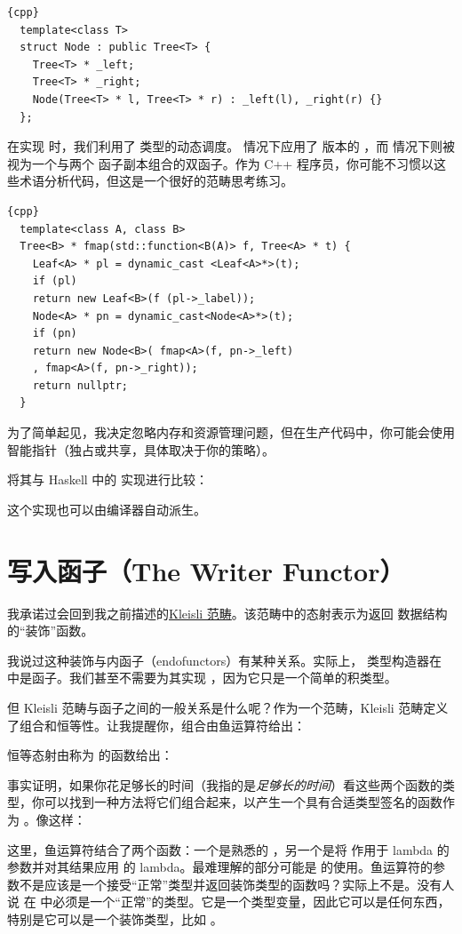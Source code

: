 \begin{lstlisting}{cpp}
  template<class T>
  struct Node : public Tree<T> {
    Tree<T> * _left;
    Tree<T> * _right;
    Node(Tree<T> * l, Tree<T> * r) : _left(l), _right(r) {}
  };
\end{lstlisting}
在实现  时，我们利用了  类型的动态调度。  情况下应用了  版本的 ，而  情况下则被视为一个与两个  函子副本组合的双函子。作为 C++ 程序员，你可能不习惯以这些术语分析代码，但这是一个很好的范畴思考练习。

\begin{lstlisting}{cpp}
  template<class A, class B>
  Tree<B> * fmap(std::function<B(A)> f, Tree<A> * t) {
    Leaf<A> * pl = dynamic_cast <Leaf<A>*>(t);
    if (pl)
    return new Leaf<B>(f (pl->_label));
    Node<A> * pn = dynamic_cast<Node<A>*>(t);
    if (pn)
    return new Node<B>( fmap<A>(f, pn->_left)
    , fmap<A>(f, pn->_right));
    return nullptr;
  }
\end{lstlisting}
为了简单起见，我决定忽略内存和资源管理问题，但在生产代码中，你可能会使用智能指针（独占或共享，具体取决于你的策略）。

将其与 Haskell 中的  实现进行比较：

这个实现也可以由编译器自动派生。

\section{写入函子（The Writer Functor）}

我承诺过会回到我之前描述的\hyperref[kleisli-categories]{Kleisli 范畴}。该范畴中的态射表示为返回  数据结构的“装饰”函数。

我说过这种装饰与内函子（endofunctors）有某种关系。实际上， 类型构造器在  中是函子。我们甚至不需要为其实现 ，因为它只是一个简单的积类型。

但 Kleisli 范畴与函子之间的一般关系是什么呢？作为一个范畴，Kleisli 范畴定义了组合和恒等性。让我提醒你，组合由鱼运算符给出：

恒等态射由称为  的函数给出：

事实证明，如果你花足够长的时间（我指的是\emph{足够长的时间}）看这些两个函数的类型，你可以找到一种方法将它们组合起来，以产生一个具有合适类型签名的函数作为 。像这样：

这里，鱼运算符结合了两个函数：一个是熟悉的 ，另一个是将  作用于 lambda 的参数并对其结果应用  的 lambda。最难理解的部分可能是  的使用。鱼运算符的参数不是应该是一个接受“正常”类型并返回装饰类型的函数吗？实际上不是。没有人说  在  中必须是一个“正常”的类型。它是一个类型变量，因此它可以是任何东西，特别是它可以是一个装饰类型，比如 。


